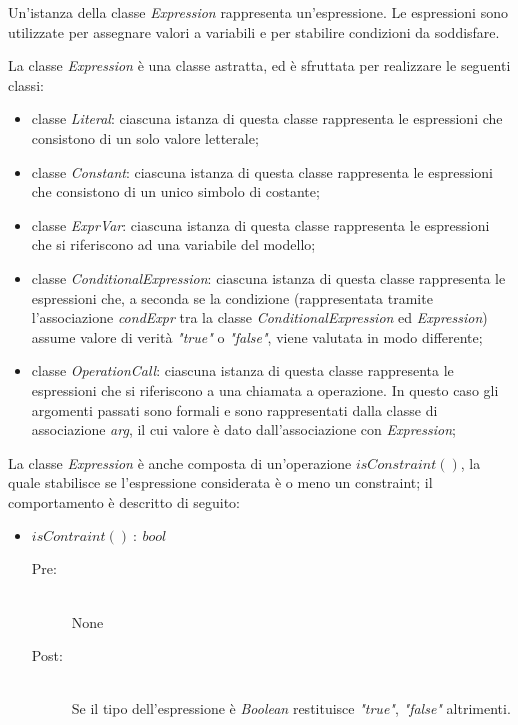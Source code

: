 
Un'istanza della classe \textit{Expression} rappresenta un'espressione. Le espressioni sono utilizzate per assegnare valori a variabili e per stabilire condizioni da soddisfare. 

La classe \textit{Expression} è una classe astratta, ed è sfruttata per realizzare le seguenti classi:
\begin{itemize}
	\item classe \textit{Literal}: ciascuna istanza di questa classe rappresenta le espressioni che consistono di un solo valore letterale;
	\item classe \textit{Constant}: ciascuna istanza di questa classe rappresenta le espressioni che consistono di un unico simbolo di costante;
	\item classe \textit{ExprVar}: ciascuna istanza di questa classe rappresenta le espressioni che si riferiscono ad una variabile del modello;
	\item classe \textit{ConditionalExpression}: ciascuna istanza di questa classe rappresenta le espressioni che, a seconda se la condizione (rappresentata tramite l'associazione \textit{condExpr} tra la classe \textit{ConditionalExpression} ed \textit{Expression}) assume valore di verità \textit{"true"} o \textit{"false"}, viene valutata in modo differente;
	\item classe \textit{OperationCall}: ciascuna istanza di questa classe rappresenta le espressioni che si riferiscono a una chiamata a operazione. In questo caso gli argomenti passati sono formali e sono rappresentati dalla classe di associazione \textit{arg}, il cui valore è dato dall'associazione con \textit{Expression};
\end{itemize}
La classe \textit{Expression} è anche composta di un'operazione $isConstraint()$, la quale stabilisce se l'espressione considerata è o meno un constraint; il comportamento è descritto di seguito:
\begin{itemize}
	\item $isContraint()\ :\ bool$ 
		\begin{description}
			\item [Pre:]\ \\ None
			\item [Post:]\ \\ Se il tipo dell'espressione è \textit{Boolean} restituisce \textit{"true"}, \textit{"false"} altrimenti.
		\end{description}
\end{itemize}
